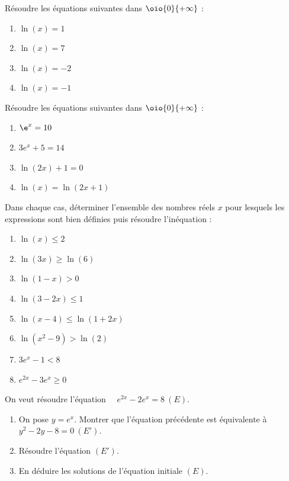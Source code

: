\documentclass[a4paper,11pt,exos]{nsi} %
\begin{document}
\exo{}
Résoudre les équations suivantes dans $\oio{0}{+\infty}$ :
\begin{multicols}{4}
    \begin{enumerate}
        \item $\ln(x)=1$
        \item $\ln(x)=7$
        \item $\ln(x)=-2$
        \item $\ln(x)=-1$
    \end{enumerate}
\end{multicols}

\exo{}
Résoudre les équations suivantes dans $\oio{0}{+\infty}$ :
\begin{multicols}{4}
    \begin{enumerate}
        \item $\e^{x}=10$
        \item $3e^x+5=14$
        \item $\ln(2x)+1=0$
        \item $\ln(x)=\ln(2x+1)$
    \end{enumerate}
\end{multicols}

\exo{}
Dans chaque cas, déterminer l'ensemble des nombres réels $x$ pour lesquels les expressions sont bien définies puis résoudre l'inéquation :
\begin{multicols}{4}
    \begin{enumerate}
        \item $\ln(x)\leqslant 2$
        \item $\ln(3x)\geqslant \ln(6)$
        \item $\ln(1-x)> 0$
        \item $\ln(3-2x)\leqslant 1$
        \item $\ln(x-4)\leqslant \ln(1+2x)$
        \item $\ln(x^2-9)>\ln(2)$
        \item $3e^x-1<8$
        \item $e^{2x}-3e^x\geqslant 0$
    \end{enumerate}
    
\end{multicols}



\exo{ \faStar}
On veut résoudre l'équation $\quad e^{2x}-2e^x=8\ (E)$.
\begin{enumerate}
    \item On pose $y=e^x$. Montrer que l'équation précédente est équivalente à $y^2-2y-8=0\ (E')$.
    \item Résoudre l'équation $(E')$.
    \item En déduire les solutions de l'équation initiale $(E)$.
\end{enumerate}
\end{document}
